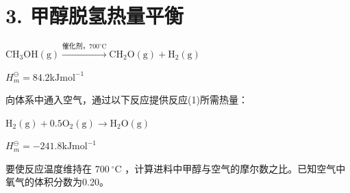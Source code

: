 \section*{3. 甲醇脱氢热量平衡}
$
\mathrm{CH} _ {3} \mathrm{OH(g)} \xrightarrow {\text {催化剂，} 7 0 0 ^ {\circ} \mathrm{C}} \mathrm{CH} _ {2} \mathrm{O(g)} + \mathrm{H} _ {2} (\mathrm{g})
$

$
H _ {m} ^ {\ominus} = 8 4. 2 \mathrm{kJ} \mathrm{mol} ^ {- 1}\tag{1}
$

向体系中通⼊空⽓，通过以下反应提供反应(1)所需热量：

$
\mathrm{H} _ {2} (\mathrm{g}) + 0. 5 \mathrm{O} _ {2} (\mathrm{g}) \rightarrow \mathrm{H} _ {2} \mathrm{O} (\mathrm{g})
$

$
H _ {m} ^ {\ominus} = - 2 4 1. 8 \mathrm{kJ} \mathrm{mol} ^ {- 1}\tag{2}
$

要使反应温度维持在 $7 0 0 ~ ^ { \circ } \mathrm { C }$ ，计算进料中甲醇与空⽓的摩尔数之⽐。已知空⽓中氧⽓的体积分数为0.20。
